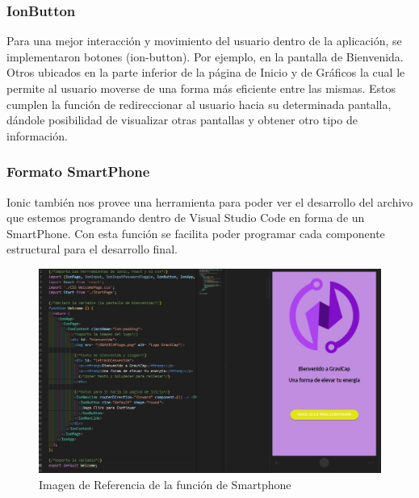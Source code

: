                 \subsubsection{IonButton}
                    Para una mejor interacción y movimiento del usuario dentro de la aplicación, se implementaron botones (ion-button). Por ejemplo, en la pantalla de Bienvenida. Otros ubicados en la parte inferior de la página de Inicio y de Gráficos la cual le permite al usuario moverse de una forma más eficiente entre las mismas. Estos cumplen la función de redireccionar al usuario hacia su determinada pantalla, dándole posibilidad de visualizar otras pantallas y obtener otro tipo de información.\par
                    
                \subsubsection{Formato SmartPhone}
                    Ionic también nos provee una herramienta para poder ver el desarrollo del archivo que estemos programando dentro de Visual Studio Code en forma de un SmartPhone. Con esta función se facilita poder programar cada componente estructural para el desarrollo final.\par
                    
                    \begin{figure}[H]
                        \centering
                        \includegraphics[width=\linewidth]{Imagenes/Aplicación/Code.jpg}
                        \caption{Imagen de Referencia de la función de Smartphone}
                        \label{fig:a15}
                    \end{figure}
        
